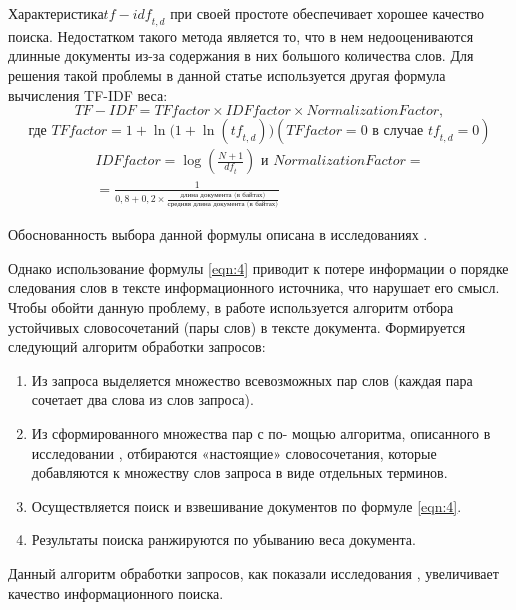 Характеристика\(\textit{tf} - \textit{idf}_{t, d}\) при своей простоте обеспечивает хорошее качество поиска. Недостатком такого метода является то, что в нем недооцениваются длинные документы из-за содержания в них большого количества слов. Для решения такой проблемы в данной статье используется другая формула вычисления TF-IDF веса:
\begin{equation}
	\label{eqn:4}
	\textit{TF} - \textit{IDF} = \textit{TFfactor} \times \textit{IDFfactor} \times \textit{NormalizationFactor},
\end{equation}
\[
\text{где } \textit{TFfactor} = 1 + \ln{(1 + \ln(\textit{tf}_{t, d})}) (\textit{TFfactor} = 0 \text{ в случае } \textit{tf}_{t, d} = 0)
\]
\begin{multline}
	\textit{IDFfactor} = \log{(\frac{N + 1}{\textit{df}_t})} \text{ и } \textit{NormalizationFactor} = \\
	=  \frac{1}{0,8 + 0,2 \times \frac{\textit{длина документа (в байтах)}}{\textit{средняя длина документа (в байтах)}}}
\end{multline}
 
Обоснованность выбора данной формулы описана в исследованиях \cite{SinghalKaszkiel}.

Однако использование формулы \cref{eqn:4} приводит к потере информации о порядке следования слов в тексте информационного источника, что нарушает его смысл. Чтобы обойти данную проблему, в работе используется алгоритм отбора устойчивых словосочетаний (пары слов) \cite{Gubin} в тексте документа. Формируется следующий алгоритм обработки запросов:
\begin{enumerate}
	\item Из запроса выделяется множество всевозможных пар слов (каждая пара сочетает два слова из слов запроса).
	\item Из сформированного множества пар с по- мощью алгоритма, описанного в исследовании \cite{Gubin}, отбираются «настоящие» словосочетания, которые добавляются к множеству слов запроса в виде отдельных терминов.
	\item Осуществляется поиск и взвешивание документов по формуле \cref{eqn:4}.
	\item Результаты поиска ранжируются по убыванию веса документа.
\end{enumerate}

Данный алгоритм обработки запросов, как показали исследования \cite{Gubin}, увеличивает качество информационного поиска.

